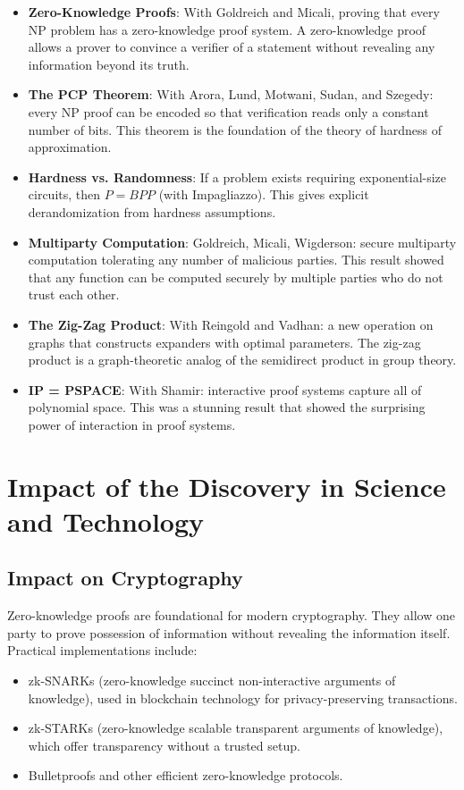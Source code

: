 \begin{itemize}
\item \textbf{Zero-Knowledge Proofs}: With Goldreich and Micali, proving that every NP problem has a zero-knowledge proof system. A zero-knowledge proof allows a prover to convince a verifier of a statement without revealing any information beyond its truth.
\item \textbf{The PCP Theorem}: With Arora, Lund, Motwani, Sudan, and Szegedy: every NP proof can be encoded so that verification reads only a constant number of bits. This theorem is the foundation of the theory of hardness of approximation.
\item \textbf{Hardness vs. Randomness}: If a problem exists requiring exponential-size circuits, then $P = BPP$ (with Impagliazzo). This gives explicit derandomization from hardness assumptions.
\item \textbf{Multiparty Computation}: Goldreich, Micali, Wigderson: secure multiparty computation tolerating any number of malicious parties. This result showed that any function can be computed securely by multiple parties who do not trust each other.
\item \textbf{The Zig-Zag Product}: With Reingold and Vadhan: a new operation on graphs that constructs expanders with optimal parameters. The zig-zag product is a graph-theoretic analog of the semidirect product in group theory.
\item \textbf{IP = PSPACE}: With Shamir: interactive proof systems capture all of polynomial space. This was a stunning result that showed the surprising power of interaction in proof systems.
\end{itemize}

\section{Impact of the Discovery in Science and Technology}

\subsection{Impact on Cryptography}

Zero-knowledge proofs are foundational for modern cryptography. They allow one party to prove possession of information without revealing the information itself. Practical implementations include:
\begin{itemize}
\item zk-SNARKs (zero-knowledge succinct non-interactive arguments of knowledge), used in blockchain technology for privacy-preserving transactions.
\item zk-STARKs (zero-knowledge scalable transparent arguments of knowledge), which offer transparency without a trusted setup.
\item Bulletproofs and other efficient zero-knowledge protocols.
\end{itemize}

